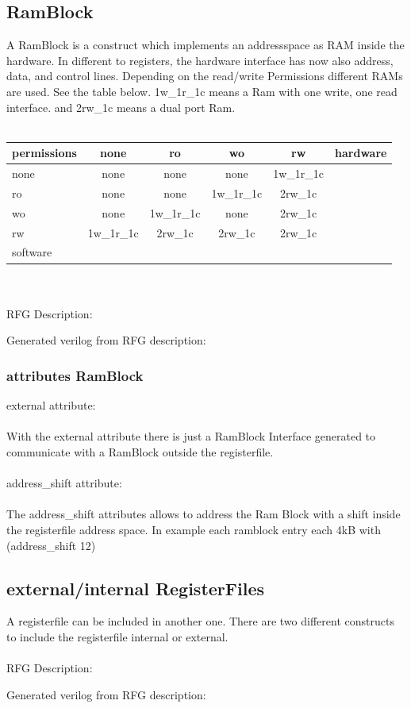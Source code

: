 \documentclass[12pt,a4paper]{article}
\begin{document}
\subsection{RamBlock}
A RamBlock is a construct which implements an addressspace as RAM inside the hardware. In different to registers, the hardware interface has now also address, data, and control lines. Depending on the read/write Permissions different RAMs are used. See the table below. 1w\_1r\_1c means a Ram with one write, one read interface. and 2rw\_1c means a dual port Ram.\\
\\
\begin{tabular}{ l || c | c | c | c | r }
    permissions & none & ro & wo & rw & hardware\\ \hline\hline
    none & none & none & none & 1w\_1r\_1c \\ \cline{1-5}
    ro & none & none & 1w\_1r\_1c& 2rw\_1c\\ \cline{1-5}
    wo & none & 1w\_1r\_1c& none & 2rw\_1c\\ \cline{1-5}
    rw & 1w\_1r\_1c& 2rw\_1c& 2rw\_1c & 2rw\_1c\\ \cline{1-5}
    software \\
\end{tabular}
\\
\\
RFG Description:
 
\newpage
Generated verilog from RFG description:

\newpage
\subsubsection{attributes RamBlock}
external attribute:\\
\\
With the external attribute there is just a RamBlock Interface generated to communicate with a RamBlock outside the registerfile.\\
\\
address\_shift attribute:\\
\\
The address\_shift attributes allows to address the Ram Block with a shift inside the registerfile address space. In example each ramblock entry each 4kB with (address\_shift 12)
\newpage
\subsection{external/internal RegisterFiles}
A registerfile can be included in another one. There are two different constructs to include the registerfile internal or external.\\
\\
RFG Description:

\newpage
Generated verilog from RFG description:
\newpage
\end{document}
